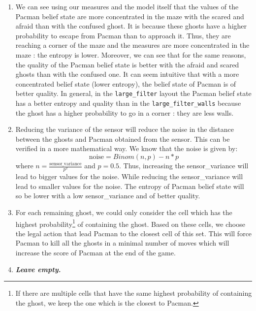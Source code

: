 \documentclass{article}
\begin{document}
\begin{enumerate}[label=\alph*.,leftmargin=*]
    \item We can see using our measures and the model itself that the values of the Pacman belief state are more concentrated in the maze with the scared and afraid than with the confused ghost. It is because these ghosts have a higher probability to escape from Pacman than to approach it. Thus, they are reaching a corner of the maze and the measures are more concentrated in the maze : the entropy is lower.
    Moreover, we can see that for the same reasons, the quality of the Pacman belief state is better with the afraid and scared ghosts than with the confused one. It can seem intuitive that with a more concentrated belief state (lower entropy), the belief state of Pacman is of better quality. In general, in the \texttt{large\_filter} layout the Pacman belief state has a better entropy and quality than in the \texttt{large\_filter\_walls} because the ghost has a higher probability to go in a corner : they are less walls.
    \item Reducing the variance of the sensor will reduce the noise in the distance between the ghosts and Pacman obtained from the sensor. This can be verified in a more mathematical way. We know that the noise is given by: $$\text{noise} = Binom(n, p) - n * p$$
    where $n = \frac{\text{sensor\_variance}}{p^2}$ and $p = 0.5$. Thus, increasing the sensor\_variance will lead to bigger values for the noise. While reducing the sensor\_variance will lead to smaller values for the noise. The entropy of Pacman belief state will so be lower with a low sensor\_variance and of better quality.
    
    \item For each remaining ghost, we could only consider the cell which has the highest probability\footnote{If there are multiple cells that have the same highest probability of containing the ghost, we keep the one which is the closest to Pacman.} of containing the ghost. Based on these cells, we choose the legal action that lead Pacman to the closest cell of this set. This will force Pacman to kill all the ghosts in a minimal number of moves which will increase the score of Pacman at the end of the game.
    \item \textbf{\textit{Leave empty.}}
\end{enumerate}

\end{document}
